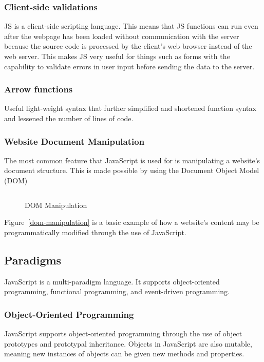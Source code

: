 \documentclass{article}
\newcommand{\js}[1]{\inputminted{javascript}{samples/js/#1.js}}
\begin{document}
    \subsubsection{Client-side validations}
    JS is a client-side scripting language. This means that JS functions can run
    even after the webpage has been loaded without communication with the server
    because the source code is processed by the client’s web browser instead of
    the web server. This makes JS very useful for things such as forms with the
    capability to validate errors in user input before sending the data to the
    server.

    \subsubsection{Arrow functions}
    Useful light-weight syntax that further simplified and shortened function
    syntax and lessened the number of lines of code.

    \subsubsection{Website Document Manipulation}
    The most common feature that JavaScript is used for is manipulating a
    website's document structure. This is made possible by using the Document
    Object Model (DOM)

    \begin{figure}[ht]
      \js{dom-manipulation}
      \caption{DOM Manipulation}
      \label{fig:dom-manipulation}
    \end{figure}

    Figure~\ref{dom-manipulation} is a basic example of how a website's content
    may be programmatically modified through the use of JavaScript.

  \subsection{Paradigms}
  JavaScript is a multi-paradigm language. It supports object-oriented
  programming, functional programming, and event-driven programming.

  \subsubsection{Object-Oriented Programming}
  JavaScript supports object-oriented programming through the use of object
  prototypes and prototypal inheritance. Objects in JavaScript are also mutable,
  meaning new instances of objects can be given new methods and properties.
\end{document}
